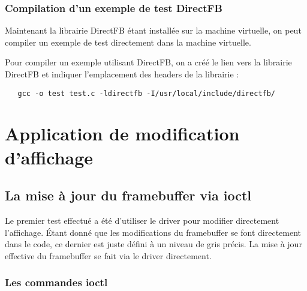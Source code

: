\subsubsection{Compilation d'un exemple de test DirectFB}

Maintenant la librairie DirectFB étant installée sur la machine virtuelle, on peut compiler un exemple de test directement dans la machine virtuelle.

Pour compiler un exemple utilisant DirectFB, on a créé le lien vers la librairie DirectFB et indiquer l'emplacement des headers de la librairie : 
\begin{lstlisting}
   gcc -o test test.c -ldirectfb -I/usr/local/include/directfb/
\end{lstlisting}

%

\newpage

\section{Application de modification d'affichage} %


\subsection{La mise à jour du framebuffer via ioctl}

Le premier test effectué a été d'utiliser le driver pour modifier directement l'affichage.
Étant donné que les modifications du framebuffer se font directement dans le code, ce dernier est juste défini à un niveau de gris précis. La mise à jour effective du framebuffer se fait via le driver directement.

\subsubsection{Les commandes ioctl}

